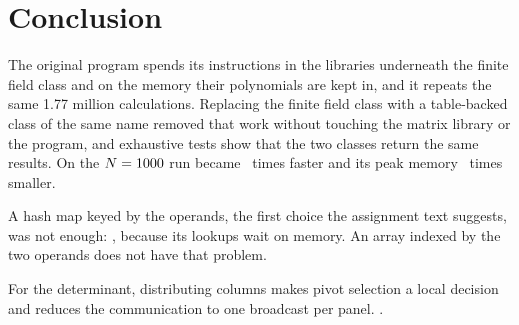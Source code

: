 \section{Conclusion}
\label{sec:conclusion}

The original program spends its instructions in the libraries underneath the finite field
class and on the memory their polynomials are kept in, and it repeats the same 1.77 million
calculations. Replacing the finite field class with a table-backed class of
the same name removed that work without touching the matrix library or the program, and
exhaustive tests show that the two classes return the same results. On \SequentialMachine{}
the $N = 1000$ run became \SeqSpeedupAtLargest~times faster and its peak memory
\SeqMemoryRatioAtLargest~times smaller.

A hash map keyed by the operands, the first choice the assignment text suggests, was not
enough: \LookupConclusionPhrase, because its lookups wait on memory. An array indexed by the
two operands does not have that problem.

For the determinant, distributing columns makes pivot selection a local decision and
reduces the communication to one broadcast per panel. \MpiConclusionSentence.
